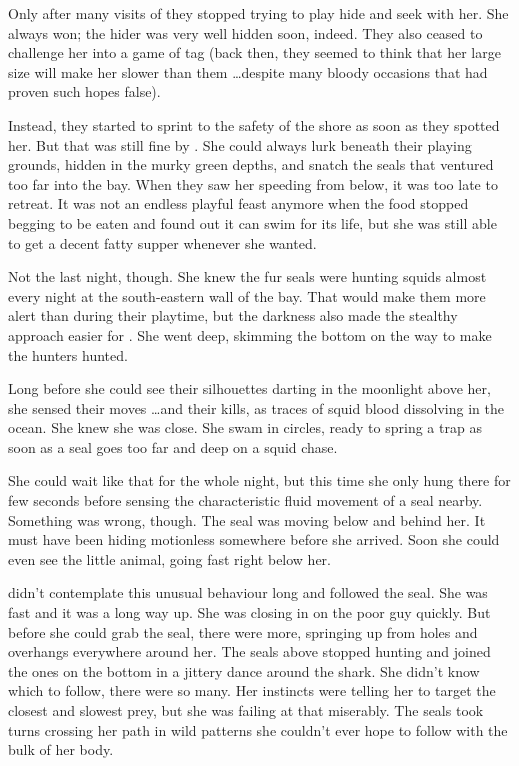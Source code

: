 Only after many visits of \sharknameformal they stopped trying to play hide and seek with her. She always won; the hider was very well hidden soon, indeed. They also ceased to challenge her into a game of tag (back then, they seemed to think that her large size will make her slower than them \dots despite many bloody occasions that had proven such hopes false). 

Instead, they started to sprint to the safety of the shore as soon as they spotted her. But that was still fine by \sharknameformal. She could always lurk beneath their playing grounds, hidden in the murky green depths, and snatch the seals that ventured too far into the bay. When they saw her speeding from below, it was too late to retreat. It was not an endless playful feast anymore when the food stopped begging to be eaten and found out it can swim for its life, but she was still able to get a decent fatty supper whenever she wanted.

Not the last night, though. She knew the fur seals were hunting squids almost every night at the south-eastern wall of the bay. That would make them more alert than during their playtime, but the darkness also made the stealthy approach easier for \sharknameformal. She went deep, skimming the bottom on the way to make the hunters hunted.

Long before she could see their silhouettes darting in the moonlight above her, she sensed their moves \dots and their kills, as traces of squid blood dissolving in the ocean. She knew she was close. She swam in circles, ready to spring a trap as soon as a seal goes too far and deep on a squid chase. 

She could wait like that for the whole night, but this time she only hung there for few seconds before sensing the characteristic fluid movement of a seal nearby. Something was wrong, though. The seal was moving below and behind her. It must have been hiding motionless somewhere before she arrived. Soon she could even see the little animal, going fast right below her.

\sharknameformal didn't contemplate this unusual behaviour long and followed the seal. She was fast and it was a long way up. She was closing in on the poor guy quickly. But before she could grab the seal, there were more, springing up from holes and overhangs everywhere around her. The seals above stopped hunting and joined the ones on the bottom in a jittery dance around the shark. She didn't know which to follow, there were so many. Her instincts were telling her to target the closest and slowest prey, but she was failing at that miserably. The seals took turns crossing her path in wild patterns she couldn't ever hope to follow with the bulk of her body.

